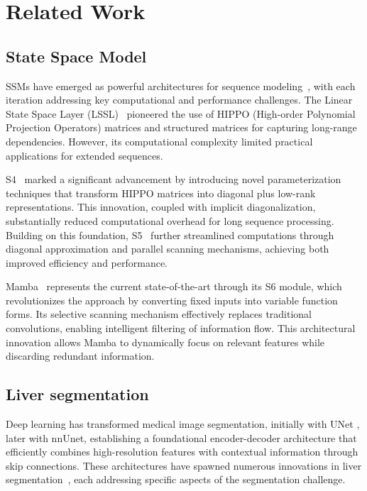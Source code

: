 \section{Related Work}
\subsection{State Space Model}
SSMs have emerged as powerful architectures for sequence modeling~\cite{fu2022hungry}, with each iteration addressing key computational and performance challenges. The Linear State Space Layer (LSSL)~\cite{gu2021efficiently} pioneered the use of HIPPO (High-order Polynomial Projection Operators) matrices and structured matrices for capturing long-range dependencies. However, its computational complexity limited practical applications for extended sequences.

S4~\cite{gu2021efficiently} marked a significant advancement by introducing novel parameterization techniques that transform HIPPO matrices into diagonal plus low-rank representations. This innovation, coupled with implicit diagonalization, substantially reduced computational overhead for long sequence processing. Building on this foundation, S5~\cite{smith2022simplified} further streamlined computations through diagonal approximation and parallel scanning mechanisms, achieving both improved efficiency and performance.

Mamba~\cite{gu2023mamba} represents the current state-of-the-art through its S6 module, which revolutionizes the approach by converting fixed inputs into variable function forms. Its selective scanning mechanism effectively replaces traditional convolutions, enabling intelligent filtering of information flow. This architectural innovation allows Mamba to dynamically focus on relevant features while discarding redundant information.

\subsection{Liver segmentation}
Deep learning has transformed medical image segmentation, initially with UNet \cite{ronneberger2015u}, later with nnUnet, establishing a foundational encoder-decoder architecture that efficiently combines high-resolution features with contextual information through skip connections. These architectures have spawned numerous innovations in liver segmentation~\cite{li2020attention, jin2020ra, kushnure2021ms, WANG2021sar-unet, gao2021asu}, each addressing specific aspects of the segmentation challenge.

